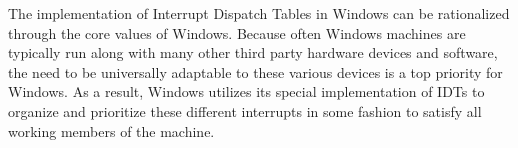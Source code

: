 \documentclass[letterpaper,10pt,titlepage]{article}
\begin{document}
The implementation of Interrupt Dispatch Tables in Windows can be rationalized through the core values of Windows.  Because often Windows machines are typically run along with many other third party hardware devices and software, the need to be universally adaptable to these various devices is a top priority for Windows.  As a result, Windows utilizes its special implementation of IDTs to organize and prioritize these different interrupts in some fashion to satisfy all working members of the machine.\\

\newpage


\end{document}
